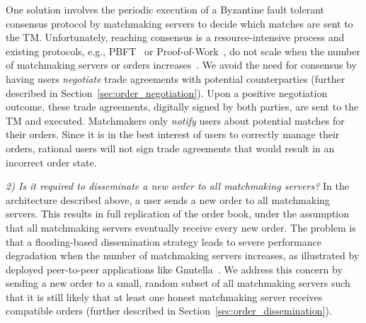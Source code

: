 One solution involves the periodic execution of a Byzantine fault tolerant consensus protocol by matchmaking servers to decide which matches are sent to the TM.
Unfortunately, reaching consensus is a resource-intensive process and existing protocols, e.g., PBFT~\cite{castro1999practical} or Proof-of-Work~\cite{gervais2016security}, do not scale when the number of matchmaking servers or orders increases~\cite{vukolic2015quest}.
We avoid the need for consensus by having users \emph{negotiate} trade agreements with potential counterparties (further described in Section~\ref{sec:order_negotiation}).
Upon a positive negotiation outcome, these trade agreements, digitally signed by both parties, are sent to the TM and executed.
Matchmakers only \emph{notify} users about potential matches for their orders.
Since it is in the best interest of users to correctly manage their orders, rational users will not sign trade agreements that would result in an incorrect order state.


\emph{2) Is it required to disseminate a new order to all matchmaking servers?}
In the architecture described above, a user sends a new order to all matchmaking servers.
This results in full replication of the order book, under the assumption that all matchmaking servers eventually receive every new order.
The problem is that a flooding-based dissemination strategy leads to severe performance degradation when the number of matchmaking servers increases, as illustrated by deployed peer-to-peer applications like Gnutella~\cite{chawathe2003making}.
We address this concern by sending a new order to a small, random subset of all matchmaking servers such that it is still likely that at least one honest matchmaking server receives compatible orders (further described in Section~\ref{sec:order_dissemination}).


